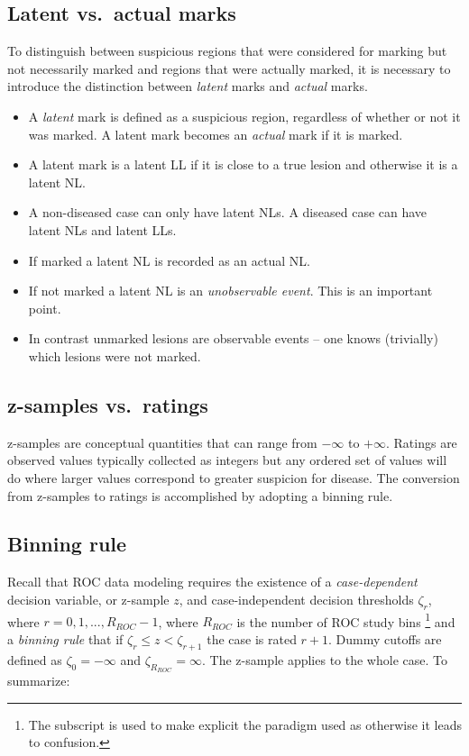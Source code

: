 \documentclass[
]{book}
\providecommand{\tightlist}{%
  \setlength{\itemsep}{0pt}\setlength{\parskip}{0pt}}
\begin{document}
\hypertarget{latent-vs.-actual-marks}{%
\subsection{Latent vs.~actual marks}\label{latent-vs.-actual-marks}}

To distinguish between suspicious regions that were considered for marking but not necessarily marked and regions that were actually marked, it is necessary to introduce the distinction between \emph{latent} marks and \emph{actual} marks.

\begin{itemize}
\tightlist
\item
  A \emph{latent} mark is defined as a suspicious region, regardless of whether or not it was marked. A latent mark becomes an \emph{actual} mark if it is marked.
\item
  A latent mark is a latent LL if it is close to a true lesion and otherwise it is a latent NL.
\item
  A non-diseased case can only have latent NLs. A diseased case can have latent NLs and latent LLs.
\item
  If marked a latent NL is recorded as an actual NL.
\item
  If not marked a latent NL is an \emph{unobservable event}. This is an important point.
\item
  In contrast unmarked lesions are observable events -- one knows (trivially) which lesions were not marked.
\end{itemize}

\hypertarget{z-samples-vs.-ratings}{%
\subsection{z-samples vs.~ratings}\label{z-samples-vs.-ratings}}

z-samples are conceptual quantities that can range from \(-\infty\) to \(+\infty\). Ratings are observed values typically collected as integers but any ordered set of values will do where larger values correspond to greater suspicion for disease. The conversion from z-samples to ratings is accomplished by adopting a binning rule.

\hypertarget{binning-rule}{%
\subsection{Binning rule}\label{binning-rule}}

Recall that ROC data modeling requires the existence of a \emph{case-dependent} decision variable, or z-sample \(z\), and case-independent decision thresholds \(\zeta_r\), where \(r = 0, 1, ..., R_{ROC}-1\), where \(R_{ROC}\) is the number of ROC study bins \footnote{The subscript is used to make explicit the paradigm used as otherwise it leads to confusion.} and a \emph{binning rule} that if \(\zeta_r \leq z < \zeta_{r+1}\) the case is rated \(r + 1\). Dummy cutoffs are defined as \(\zeta_0 = -\infty\) and \(\zeta_{R_{ROC}} = \infty\). The z-sample applies to the whole case. To summarize:
\end{document}
